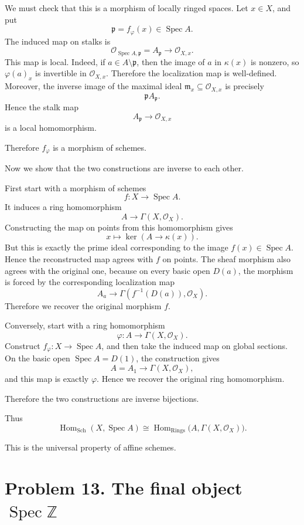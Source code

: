 \documentclass[12pt,a4paper]{article}
\DeclareMathOperator{\Hom}{Hom}
\newcommand{\Spec}{\operatorname{Spec}}
\newcommand{\Sch}{\mathrm{Sch}}
\newcommand{\Rings}{\mathrm{Rings}}
\theoremstyle{notespace}
\begin{document}
We must check that this is a morphism of locally ringed spaces. Let \(x\in X\), and put
\[
\mathfrak p=f_\varphi(x)\in \Spec A.
\]
The induced map on stalks is
\[
\mathcal O_{\Spec A,\mathfrak p}=A_{\mathfrak p}
\longrightarrow
\mathcal O_{X,x}.
\]
This map is local. Indeed, if \(a\in A\setminus \mathfrak p\), then the image of \(a\) in \(\kappa(x)\) is nonzero, so \(\varphi(a)_x\) is invertible in \(\mathcal O_{X,x}\). Therefore the localization map is well-defined. Moreover, the inverse image of the maximal ideal \(\mathfrak m_x\subseteq \mathcal O_{X,x}\) is precisely
\[
\mathfrak pA_{\mathfrak p}.
\]
Hence the stalk map
\[
A_{\mathfrak p}\to \mathcal O_{X,x}
\]
is a local homomorphism.

Therefore \(f_\varphi\) is a morphism of schemes.

Now we show that the two constructions are inverse to each other.

First start with a morphism of schemes
\[
f:X\to \Spec A.
\]
It induces a ring homomorphism
\[
A\to \Gamma(X,\mathcal O_X).
\]
Constructing the map on points from this homomorphism gives
\[
x\longmapsto
\ker\left(A\to \kappa(x)\right).
\]
But this is exactly the prime ideal corresponding to the image \(f(x)\in \Spec A\). Hence the reconstructed map agrees with \(f\) on points. The sheaf morphism also agrees with the original one, because on every basic open \(D(a)\), the morphism is forced by the corresponding localization map
\[
A_a\to \Gamma(f^{-1}(D(a)),\mathcal O_X).
\]
Therefore we recover the original morphism \(f\).

Conversely, start with a ring homomorphism
\[
\varphi:A\to \Gamma(X,\mathcal O_X).
\]
Construct \(f_\varphi:X\to \Spec A\), and then take the induced map on global sections. On the basic open \(\Spec A=D(1)\), the construction gives
\[
A=A_1
\longrightarrow
\Gamma(X,\mathcal O_X),
\]
and this map is exactly \(\varphi\). Hence we recover the original ring homomorphism.

Therefore the two constructions are inverse bijections.

Thus
\[
\boxed{
	\Hom_{\Sch}(X,\Spec A)
	\cong
	\Hom_{\Rings}\bigl(A,\Gamma(X,\mathcal O_X)\bigr)
}.
\]

This is the universal property of affine schemes.

\section{Problem 13. The final object \(\Spec \mathbb Z\)}
\end{document}
